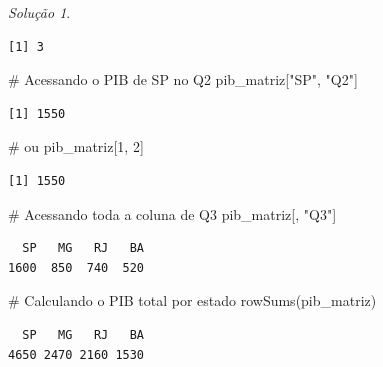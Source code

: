 \documentclass[
  portuguese,
  letterpaper,
  DIV=11,
  numbers=noendperiod]{scrreprt}
\newenvironment{Shaded}{\begin{snugshade}}{\end{snugshade}}
\newcommand{\CommentTok}[1]{\textcolor[rgb]{0.37,0.37,0.37}{#1}}
\newcommand{\DecValTok}[1]{\textcolor[rgb]{0.68,0.00,0.00}{#1}}
\newcommand{\FunctionTok}[1]{\textcolor[rgb]{0.28,0.35,0.67}{#1}}
\newcommand{\NormalTok}[1]{\textcolor[rgb]{0.00,0.23,0.31}{#1}}
\newcommand{\StringTok}[1]{\textcolor[rgb]{0.13,0.47,0.30}{#1}}
\theoremstyle{definition}
\theoremstyle{remark}
\newtheorem*{solution}{Solução}
\begin{document}
\begin{solution}
\begin{verbatim}
[1] 3
\end{verbatim}

\begin{Shaded}
\begin{Highlighting}[]
\CommentTok{\# Acessando o PIB de SP no Q2}
\NormalTok{pib\_matriz[}\StringTok{"SP"}\NormalTok{, }\StringTok{"Q2"}\NormalTok{]}
\end{Highlighting}
\end{Shaded}

\begin{verbatim}
[1] 1550
\end{verbatim}

\begin{Shaded}
\begin{Highlighting}[]
\CommentTok{\# ou}
\NormalTok{pib\_matriz[}\DecValTok{1}\NormalTok{, }\DecValTok{2}\NormalTok{]}
\end{Highlighting}
\end{Shaded}

\begin{verbatim}
[1] 1550
\end{verbatim}

\begin{Shaded}
\begin{Highlighting}[]
\CommentTok{\# Acessando toda a coluna de Q3}
\NormalTok{pib\_matriz[, }\StringTok{"Q3"}\NormalTok{]}
\end{Highlighting}
\end{Shaded}

\begin{verbatim}
  SP   MG   RJ   BA 
1600  850  740  520 
\end{verbatim}

\begin{Shaded}
\begin{Highlighting}[]
\CommentTok{\# Calculando o PIB total por estado}
\FunctionTok{rowSums}\NormalTok{(pib\_matriz)}
\end{Highlighting}
\end{Shaded}

\begin{verbatim}
  SP   MG   RJ   BA 
4650 2470 2160 1530 
\end{verbatim}

\end{solution}
\end{document}
